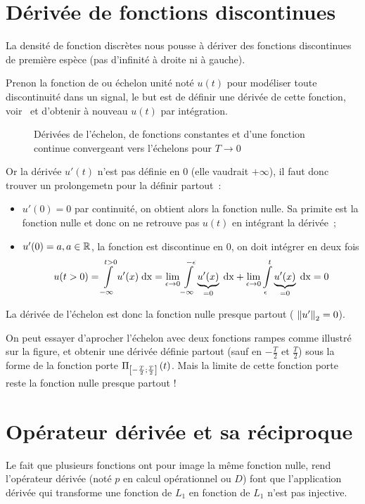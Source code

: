 \section{Dérivée de fonctions discontinues}
\label{sec:deriv_discontinues}
La densité de fonction discrètes nous pousse à dériver des fonctions
discontinues de première espèce (pas d'infinité à droite ni à gauche). 

Prenon la fonction de \Heaviside{} ou échelon unité noté $u(t)$ pour
modéliser toute discontinuité dans un signal, le but est de définir
une dérivée de cette fonction, voir~ et
d'obtenir à nouveau $u(t)$ par intégration.

\begin{figure}[ht!]
  \centering
  \caption{Dérivées de l'échelon, de fonctions constantes et d'une fonction continue convergeant vers l'échelons pour $T\to0$}
  \label{fig:derivee_echelon}
\end{figure}

Or la dérivée $u'(t)$ n'est pas définie en $0$ (elle vaudrait $+\infty$), il faut donc trouver un prolongemetn pour la définir partout~:
\begin{itemize}
\item $u'(0)=0$ par continuité, on obtient alors la fonction nulle. Sa primite est la fonction nulle et donc on ne retrouve pas $u(t)$ en intégrant la dérivée~;
\item $u'(0)=a, a\in \mathbb{R}$, la fonction est discontinue en $0$, on doit intégrer en deux fois $$u(t>0)=\int\limits_{-\infty}^{t>0}{u'(x)\;\mathrm{d{x}}}=\lim\limits_{\epsilon\to 0}\int\limits_{-\infty}^{-\epsilon}{\underbrace{u'(x)}_{=0}\;\mathrm{d{x}}}+\lim\limits_{\epsilon\to 0}\int\limits_{\epsilon}^{t}{\underbrace{u'(x)}_{=0}\;\mathrm{d{x}}}=0$$ 
\end{itemize}

La dérivée de l'échelon est donc la fonction nulle \og{} presque partout \fg{} ( $\left\|u'\right\|_2=0$).

On peut essayer d'aprocher l'échelon avec deux fonctions rampes comme
illustré sur la figure, et obtenir une dérivée définie partout (sauf
en $-\frac{T}{2}$ et $\frac{T}{2}$) sous la forme de la fonction porte
$\Pi_{\left[-\frac{T}{2} ; \frac{T}{2}\right]}\left(t\right)$. Mais la limite de cette
fonction porte reste la fonction nulle presque partout !


\section{Opérateur dérivée et sa réciproque}
\label{sec:dirac_derivee}
Le fait que plusieurs fonctions ont pour image la même fonction
nulle, rend l'opérateur dérivée (noté $p$ en calcul opérationnel ou
$D$) font que l'application dérivée qui transforme une fonction de
$L_1$ en fonction de $L_1$ n'est pas injective.

